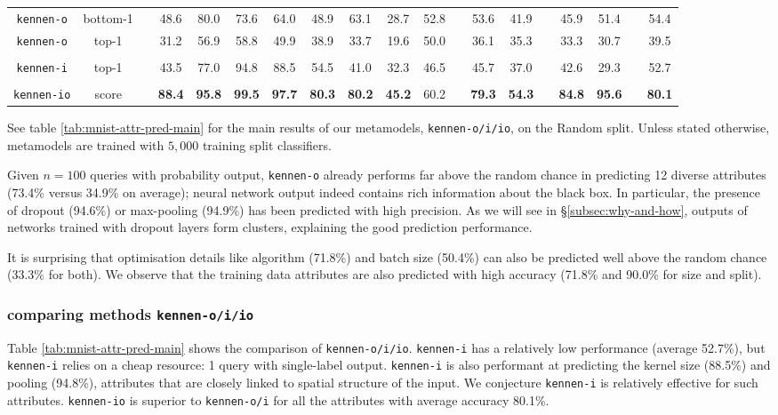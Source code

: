 \documentclass{article} %
\newcommand{\OR}{\texttt{kennen-o}\xspace}
\newcommand{\IC}{\texttt{kennen-i}\xspace}
\newcommand{\ORIC}{\texttt{kennen-io}\xspace}
\begin{document}
\begin{table}
\begin{centering}
\begin{tabular}{ccc*{8}{c}c*{2}{c}c*{2}{c}c*{1}{c}}
\OR &bottom-1&& 	48.6 & 80.0 & 73.6 & 64.0 & 48.9 & 63.1 & 28.7 & 52.8 &  & 53.6 & 41.9 &  & 45.9 & 51.4 &  & 54.4 \tabularnewline
\OR &top-1&& 	31.2 & 56.9 & 58.8 & 49.9 & 38.9 & 33.7 & 19.6 & 50.0 &  & 36.1 & 35.3 &  & 33.3 & 30.7 &  & 39.5 \tabularnewline
\cline{1-2} \cline{4-11} \cline{13-14} \cline{16-17} \cline{19-19}   
\vspace{-0.8em} &   \tabularnewline
\IC &top-1&& 	43.5 & 77.0 & 94.8 & 88.5 & 54.5 & 41.0 & 32.3 & 46.5 &  & 45.7 & 37.0 &  & 42.6 & 29.3 &  & 52.7 \tabularnewline
\cline{1-2} \cline{4-11} \cline{13-14} \cline{16-17} \cline{19-19}   
\vspace{-0.8em} &   \tabularnewline
\ORIC &score&&	{\bf 88.4} & {\bf 95.8} & {\bf 99.5} & {\bf 97.7} & {\bf 80.3} & {\bf 80.2} & {\bf 45.2} & 60.2 &  & {\bf 79.3} & {\bf 54.3} &  & {\bf 84.8} & {\bf 95.6} &  & {\bf 80.1} \tabularnewline
\cline{1-2} \cline{4-11} \cline{13-14} \cline{16-17} \cline{19-19}    
\end{tabular}
\par\end{centering}
\vspace{0em}
\end{table}

See table \ref{tab:mnist-attr-pred-main} for the main results of our metamodels, \texttt{kennen-o/i/io}, on the Random split. Unless stated otherwise, metamodels are trained with $5,000$ training split classifiers. 

Given $n=100$ queries with probability output, \OR already performs far above the random chance in predicting 12 diverse attributes (73.4\% versus 34.9\% on average); neural network output indeed contains rich information about the black box. In particular, the presence of dropout (94.6\%) or max-pooling (94.9\%) has been predicted with high precision. As we will see in \S\ref{subsec:why-and-how}, outputs of networks trained with dropout layers form clusters, explaining the good prediction performance.

It is surprising that optimisation details like algorithm (71.8\%) and batch size (50.4\%) can also be predicted well above the random chance (33.3\% for both). We observe that the training data attributes are also predicted with high accuracy (71.8\% and 90.0\% for size and split).

\subsubsection*{comparing methods \texttt{kennen-o/i/io}}
Table \ref{tab:mnist-attr-pred-main} shows the comparison of \texttt{kennen-o/i/io}. \IC has a relatively low performance (average 52.7\%), but \IC relies on a cheap resource: 1 query with single-label output. \IC is also performant at predicting the kernel size (88.5\%) and pooling (94.8\%), attributes that are closely linked to spatial structure of the input. We conjecture \IC is relatively effective for such attributes. \ORIC is superior to \texttt{kennen-o/i} for all the attributes with average accuracy 80.1\%.
\end{document}
